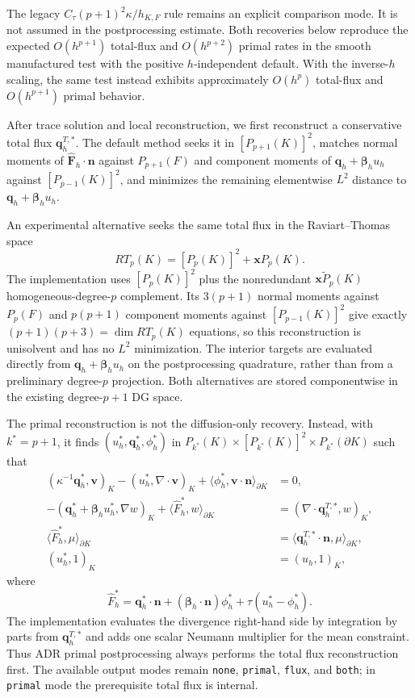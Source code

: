 \documentclass{article}
\newcommand{\uh}{u_h}
\newcommand{\qh}{\boldsymbol q_h}
\newcommand{\bh}{\boldsymbol\beta_h}
\begin{document}
The legacy $C_\tau(p+1)^2\kappa/h_{K,F}$ rule remains an explicit comparison
mode.  It is not assumed in the postprocessing estimate.  Both recoveries
below reproduce the expected $O(h^{p+1})$ total-flux and $O(h^{p+2})$ primal
rates in the smooth manufactured test with the positive $h$-independent
default.  With the inverse-$h$ scaling, the same test instead exhibits
approximately $O(h^p)$ total-flux and $O(h^{p+1})$ primal behavior.

After trace solution and local reconstruction, we first reconstruct a
conservative total flux $\boldsymbol q_h^{T,*}$.  The default method seeks it
in $[P_{p+1}(K)]^2$, matches normal moments of
$\widehat{\boldsymbol F}_h\!\cdot\boldsymbol n$ against $P_{p+1}(F)$ and
component moments of $\qh+\bh\uh$ against $[P_{p-1}(K)]^2$, and minimizes the
remaining elementwise $L^2$ distance to $\qh+\bh\uh$.

An experimental alternative seeks the same total flux in the Raviart--Thomas
space
\[
 RT_p(K)=[P_p(K)]^2+\boldsymbol x P_p(K).
\]
The implementation uses $[P_p(K)]^2$ plus the nonredundant
$\boldsymbol x\widetilde P_p(K)$ homogeneous-degree-$p$ complement.  Its
$3(p+1)$ normal moments against $P_p(F)$ and $p(p+1)$ component moments
against $[P_{p-1}(K)]^2$ give exactly
$(p+1)(p+3)=\dim RT_p(K)$ equations, so this reconstruction is unisolvent and
has no $L^2$ minimization.  The interior targets are evaluated directly from
$\qh+\bh\uh$ on the postprocessing quadrature, rather than from a preliminary
degree-$p$ projection.  Both alternatives are stored componentwise in the
existing degree-$p+1$ DG space.

The primal reconstruction is not the diffusion-only recovery.
Instead, with $k^*=p+1$, it finds
$(u_h^*,\boldsymbol q_h^*,\phi_h^*)$ in
$P_{k^*}(K)\times[P_{k^*}(K)]^2\times P_{k^*}(\partial K)$ such that
\begin{align*}
 (\kappa^{-1}\boldsymbol q_h^*,\boldsymbol v)_K
 -(u_h^*,\nabla\!\cdot\boldsymbol v)_K
 +\langle\phi_h^*,\boldsymbol v\!\cdot\boldsymbol n\rangle_{\partial K}&=0,\\
 -(\boldsymbol q_h^*+\bh u_h^*,\nabla w)_K
 +\langle\widehat F_h^*,w\rangle_{\partial K}
 &=(\nabla\!\cdot\boldsymbol q_h^{T,*},w)_K,\\
 \langle\widehat F_h^*,\mu\rangle_{\partial K}
 &=\langle\boldsymbol q_h^{T,*}\!\cdot\boldsymbol n,\mu\rangle_{\partial K},\\
 (u_h^*,1)_K&=(\uh,1)_K,
\end{align*}
where
\[
 \widehat F_h^*=\boldsymbol q_h^*\!\cdot\boldsymbol n
 +(\bh\!\cdot\boldsymbol n)\phi_h^*
 +\tau(u_h^*-\phi_h^*).
\]
The implementation evaluates the divergence right-hand side by integration by
parts from $\boldsymbol q_h^{T,*}$ and adds one scalar Neumann multiplier for
the mean constraint.  Thus ADR primal postprocessing always performs the total
flux reconstruction first.  The available output modes remain
\texttt{none}, \texttt{primal}, \texttt{flux}, and \texttt{both}; in
\texttt{primal} mode the prerequisite total flux is internal.
\end{document}
